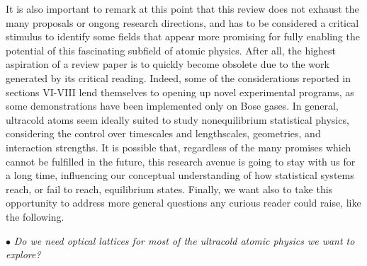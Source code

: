 \documentclass[pra,letterpaper,twocolumn,showpacs,superscriptaddress]{revtex4}
\begin{document}
It is also important to remark at this point that this review does not exhaust the many proposals or ongong research directions, and 
has to be considered a critical stimulus to identify some fields that appear more promising for fully enabling the potential of 
this fascinating subfield of atomic physics. After all, the highest aspiration of a review paper is to quickly become obsolete due to the work 
generated by its critical reading. Indeed, some of the considerations reported in sections VI-VIII lend themselves to opening up 
novel experimental programs, as some demonstrations have been implemented only on Bose gases.  
In general, ultracold atoms seem ideally suited to study nonequilibrium statistical physics, considering the control over  
timescales and lengthscales, geometries, and interaction strengths. It is possible that, regardless of the many promises which cannot be 
fulfilled in the future, this research avenue is going to stay with us for a long time, influencing our conceptual understanding of how 
statistical systems reach, or fail to reach, equilibrium states. Finally, we want also to take this opportunity to address more general 
questions any curious reader could raise, like the following.

\vspace{2.0mm}

\noindent
$\bullet$ {\sl Do we need optical lattices for most of the ultracold atomic physics we want to explore?}
\end{document}
